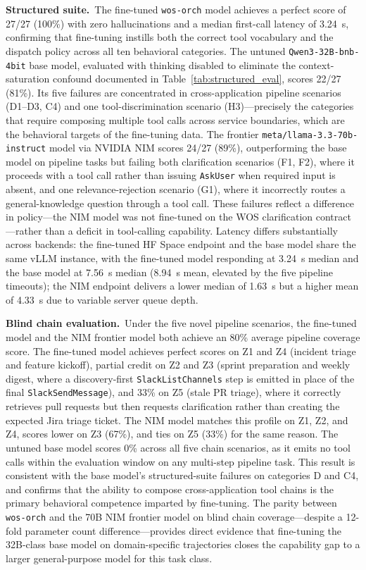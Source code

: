 \documentclass[conference]{IEEEtran}
\begin{document}
\textbf{Structured suite.}\, The fine-tuned \texttt{wos-orch} model achieves a perfect score of 27/27 (100\%) with zero hallucinations and a median first-call latency of 3.24~s, confirming that fine-tuning instills both the correct tool vocabulary and the dispatch policy across all ten behavioral categories. The untuned \texttt{Qwen3-32B-bnb-4bit} base model, evaluated with thinking disabled to eliminate the context-saturation confound documented in Table~\ref{tab:structured_eval}, scores 22/27 (81\%). Its five failures are concentrated in cross-application pipeline scenarios (D1--D3, C4) and one tool-discrimination scenario (H3)---precisely the categories that require composing multiple tool calls across service boundaries, which are the behavioral targets of the fine-tuning data. The frontier \texttt{meta/llama-3.3-70b-instruct} model via NVIDIA NIM scores 24/27 (89\%), outperforming the base model on pipeline tasks but failing both clarification scenarios (F1, F2), where it proceeds with a tool call rather than issuing \texttt{AskUser} when required input is absent, and one relevance-rejection scenario (G1), where it incorrectly routes a general-knowledge question through a tool call. These failures reflect a difference in policy---the NIM model was not fine-tuned on the WOS clarification contract---rather than a deficit in tool-calling capability. Latency differs substantially across backends: the fine-tuned HF Space endpoint and the base model share the same vLLM instance, with the fine-tuned model responding at 3.24~s median and the base model at 7.56~s median (8.94~s mean, elevated by the five pipeline timeouts); the NIM endpoint delivers a lower median of 1.63~s but a higher mean of 4.33~s due to variable server queue depth.

\textbf{Blind chain evaluation.}\, Under the five novel pipeline scenarios, the fine-tuned model and the NIM frontier model both achieve an 80\% average pipeline coverage score. The fine-tuned model achieves perfect scores on Z1 and Z4 (incident triage and feature kickoff), partial credit on Z2 and Z3 (sprint preparation and weekly digest, where a discovery-first \texttt{SlackListChannels} step is emitted in place of the final \texttt{SlackSendMessage}), and 33\% on Z5 (stale PR triage), where it correctly retrieves pull requests but then requests clarification rather than creating the expected Jira triage ticket. The NIM model matches this profile on Z1, Z2, and Z4, scores lower on Z3 (67\%), and ties on Z5 (33\%) for the same reason. The untuned base model scores 0\% across all five chain scenarios, as it emits no tool calls within the evaluation window on any multi-step pipeline task. This result is consistent with the base model's structured-suite failures on categories D and C4, and confirms that the ability to compose cross-application tool chains is the primary behavioral competence imparted by fine-tuning. The parity between \texttt{wos-orch} and the 70B NIM frontier model on blind chain coverage---despite a 12-fold parameter count difference---provides direct evidence that fine-tuning the 32B-class base model on domain-specific trajectories closes the capability gap to a larger general-purpose model for this task class.
\end{document}
